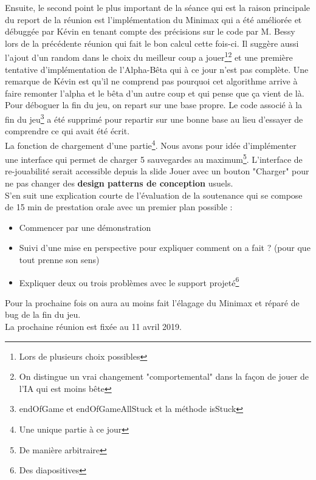 \documentclass[11pt,a4paper]{article}
\begin{document}
    Ensuite, le second point le plus important de la séance qui est la raison principale du report de la réunion est l'implémentation du Minimax qui a été améliorée et débuggée par Kévin en tenant compte des précisions sur le code par M. Bessy lors de la précédente réunion qui fait le bon calcul cette fois-ci. Il suggère aussi l'ajout d'un random dans le choix du meilleur coup a jouer\footnote{Lors de plusieurs choix possibles}\footnote{On distingue un vrai changement "comportemental" dans la façon de jouer de l'IA qui est moins bête} et une première tentative d'implémentation de l'Alpha-Bêta qui à ce jour n'est pas complète. Une remarque de Kévin est qu'il ne comprend pas pourquoi cet algorithme arrive à faire remonter l'alpha et le bêta d'un autre coup et qui pense que ça vient de là.\\
    
    Pour déboguer la fin du jeu, on repart sur une base propre. Le code associé à la fin du jeu\footnote{endOfGame et endOfGameAllStuck et la méthode isStuck} a été supprimé pour repartir sur une bonne base au lieu d'essayer de comprendre ce qui avait été écrit.\\
    
    La fonction de chargement d'une partie\footnote{Une unique partie à ce jour}. Nous avons pour idée d'implémenter une interface qui permet de charger 5 sauvegardes au maximum\footnote{De manière arbitraire}. L'interface de re-jouabilité serait accessible depuis la slide Jouer avec un bouton "Charger" pour ne pas changer des \textbf{design patterns de conception} usuels.\\
    
    S'en suit une explication courte de l'évaluation de la soutenance qui se compose de 15 min de prestation orale avec un premier plan possible :
    \begin{itemize}
        \item Commencer par une démonstration
        \item Suivi d'une mise en perspective pour expliquer comment on a fait ? (pour que tout prenne son sens)
        \item Expliquer deux ou trois problèmes avec le support projeté\footnote{Des diapositives}
    \end{itemize}
    
    Pour la prochaine fois on aura au moins fait l'élagage du Minimax et réparé de bug de la fin du jeu.\\
    
    La prochaine réunion est fixée au 11 avril 2019.
\end{document}
